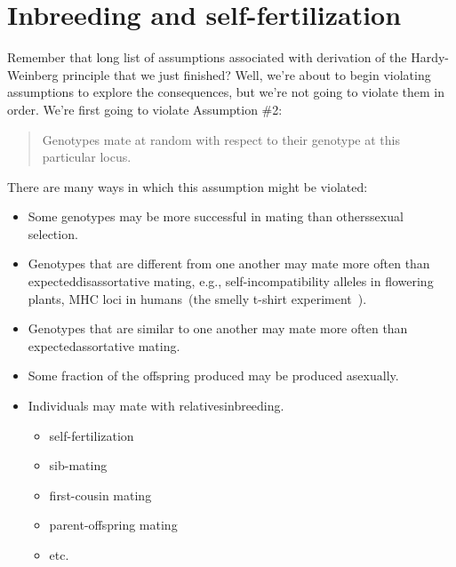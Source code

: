 \chapter{Inbreeding and self-fertilization}

Remember that long list of assumptions associated with derivation of
the Hardy-Weinberg principle that we just finished? Well, we're about
to begin violating assumptions to explore the consequences, but we're
not going to violate them in order. We're first going to violate
Assumption \#2:

\begin{quote}
Genotypes mate at random with respect to their genotype at this
particular locus.
\end{quote}

\noindent There are many ways in which this assumption might be
violated:

\begin{itemize}

\item Some genotypes may be more successful in mating than
  others{\dash}sexual selection.

\item Genotypes that are different from one another may mate more
  often than expected{\dash}disassortative mating, e.g.,
  self-incompatibility alleles in flowering plants, MHC loci in
  humans~(the smelly t-shirt
  experiment~\cite{Wedekind-etal-1995}).

\item Genotypes that are similar to one another may mate more often
  than expected{\dash}assortative mating.

\item Some fraction of the offspring produced may be produced
  asexually.

\item Individuals may mate with
  relatives{\dash}inbreeding.

\begin{itemize}

\item self-fertilization

\item sib-mating

\item first-cousin mating

\item parent-offspring mating

\item etc.

\end{itemize}

\end{itemize}

